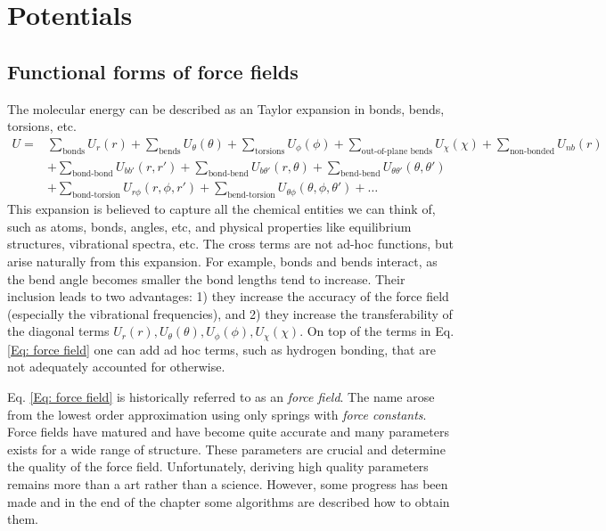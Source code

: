 \chapter{Potentials}

\section{Functional forms of force fields}

The molecular energy can be described as an Taylor expansion in bonds, bends, torsions, etc.
\begin{equation}
 \begin{split}
 U=&\sum_{\text{bonds}} U_r\left(r\right)+\sum_{\text{bends}} U_\theta\left(\theta\right)+
   \sum_{\text{torsions}} U_\phi\left(\phi\right)+\sum_{\text{out-of-plane bends}} U_\chi\left(\chi\right)
   +\sum_{\text{non-bonded}}U_{nb}\left(r\right)\\
   &+\sum_{\text{bond-bond}}U_{bb'}\left(r,r'\right)
   +\sum_{\text{bond-bend}}U_{b\theta'}\left(r,\theta\right)
   +\sum_{\text{bend-bend}}U_{\theta\theta'}\left(\theta,\theta'\right)\\
   &+\sum_{\text{bond-torsion}}U_{r\phi}\left(r,\phi,r'\right)
   +\sum_{\text{bend-torsion}}U_{\theta\phi}\left(\theta,\phi,\theta'\right)+\dots
  \end{split}
  \label{Eq: force field}
\end{equation}
This expansion is believed to capture all the chemical entities we can think of, such as
atoms, bonds, angles, etc, and physical properties like equilibrium structures, vibrational spectra, etc.
The cross terms are not ad-hoc functions, but arise naturally from this expansion. 
For example, bonds and bends interact, as the bend angle becomes smaller the bond lengths tend to increase.
Their inclusion leads to two advantages: 1) they increase the accuracy of the force field
(especially the vibrational frequencies), and 2) they
increase the transferability of the diagonal terms $U_r\left(r\right),U_\theta\left(\theta\right),
U_\phi\left(\phi\right),U_\chi\left(\chi\right)$.
On top of the terms in Eq. \ref{Eq: force field} one can add ad hoc terms, such as hydrogen bonding, that
are not adequately accounted for otherwise.

Eq. \ref{Eq: force field} is historically referred to as an \emph{force field}. The name arose from the lowest
order approximation using only springs with \emph{force constants}. Force fields have matured
and have become quite accurate and many parameters exists for a wide range of structure. These parameters
are crucial and determine the quality of the force field. Unfortunately, deriving high quality parameters
remains more than a art rather than a science. However, some progress has been made and in the end of the chapter
some algorithms are described how to obtain them.

